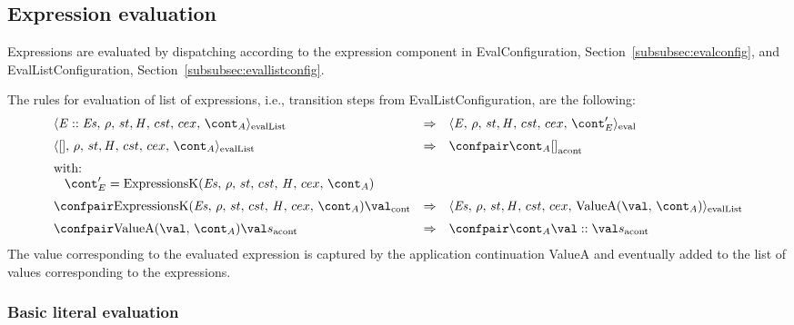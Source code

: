 \documentclass{article}
\begin{document}
\subsection{Expression evaluation}
\label{subsec:expr-evaluation}
\newcommand{\ExpressionsK}[6]{\mathrm{ExpressionsK}({#1},\,{#2},\,{#3},\,{#4},\,{\handler},\,{#5},\,{#6})}
\newcommand{\ExpressionK}[2]{\mathrm{ExpressionK}({#1},\,{#2})}
\newcommand{\ValueA}[2]{\mathrm{ValueA}({#1},\,{#2})}

Expressions are evaluated by dispatching according to the expression component in EvalConfiguration, Section~\ref{subsubsec:evalconfig}, and EvalListConfiguration, Section~\ref{subsubsec:evallistconfig}.

\noindent
The rules for evaluation of list of expressions, i.e., transition steps from EvalListConfiguration, are the following:
\label{subsec:eval-list-expressions}
\[
  \begin{array}{lcl}
	\cesktrans{
		\evallistconf{\expr :: \exprs}{\env}{\strace}{\cstrace}{\cex}{\acont}}{
		\evalconf{\expr}{\env}{\strace}{\cstrace}{\cex}{\econt'}}
		\\[2mm]

	\cesktrans{
		\evallistconf{[]}{\env}{\strace}{\cstrace}{\cex}{\acont}}{
		\acontconf{\acont}{[]}}
		\\[2mm]
	\textrm{with:}\\
	\hspace{3mm}\econt' = \ExpressionsK{\exprs}{\env}{\strace}{\cstrace}{\cex}{\acont}
	\\[2mm]

	\cesktrans{
		\contconf{\ExpressionsK{\exprs}{\env}{\strace}{\cstrace}{\cex}{\acont}}{\val}}{
		\evallistconf{\exprs}{\env}{\strace}{\cstrace}{\cex}{\ValueA{\val}{\acont}}}
		\\[2mm]

	\cesktrans{
		\acontconf{\ValueA{\val}{\acont}}{\val s}}{
		\acontconf{\acont}{\val :: \val s}}

  \end{array}
\]
The value corresponding to the evaluated expression is captured by the application continuation ValueA and eventually added to the list of values corresponding to the expressions.
\subsubsection{Basic literal evaluation}
\label{subsubsec:basic-literal-eval}
\end{document}
